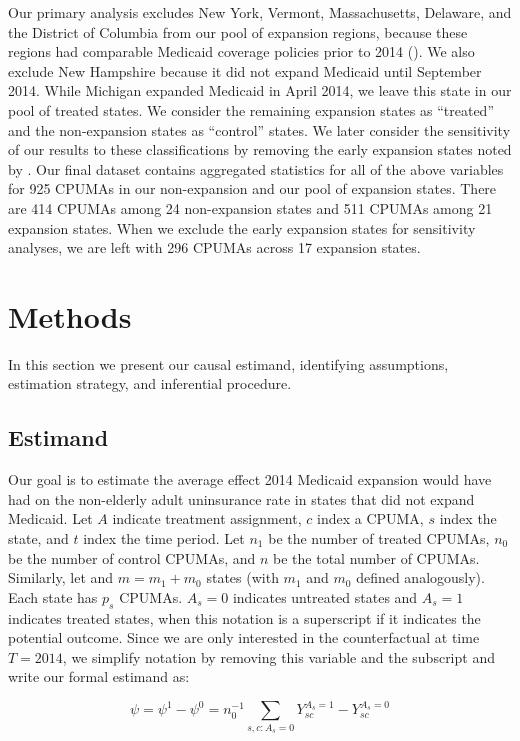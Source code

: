 \documentclass[article]{imsart}
\theoremstyle{plain}
\theoremstyle{remark}
\begin{document}
Our primary analysis excludes New York, Vermont, Massachusetts, Delaware, and the District of Columbia from our pool of expansion regions, because these regions had comparable Medicaid coverage policies prior to 2014 (\cite{kaestner2017effects}). We also exclude New Hampshire because it did not expand Medicaid until September 2014. While Michigan expanded Medicaid in April 2014, we leave this state in our pool of treated states. We consider the remaining expansion states as ``treated'' and the non-expansion states as ``control'' states. We later consider the sensitivity of our results to these classifications by removing the early expansion states noted by \cite{frean2017premium}. Our final dataset contains aggregated statistics for all of the above variables for 925 CPUMAs in our non-expansion and our pool of expansion states. There are 414 CPUMAs among 24 non-expansion states and 511 CPUMAs among 21 expansion states. When we exclude the early expansion states for sensitivity analyses, we are left with 296 CPUMAs across 17 expansion states.

\section{Methods}\label{sec:methods}

In this section we present our causal estimand, identifying assumptions, estimation strategy, and inferential procedure.

\subsection{Estimand}

Our goal is to estimate the average effect 2014 Medicaid expansion would have had on the non-elderly adult uninsurance rate in states that did not expand Medicaid. Let $A$ indicate treatment assignment, $c$ index a CPUMA, $s$ index the state, and $t$ index the time period. Let $n_1$ be the number of treated CPUMAs, $n_0$ be the number of control CPUMAs, and $n$ be the total number of CPUMAs. Similarly, let and $m = m_1 + m_0$ states (with $m_1$ and $m_0$ defined analogously). Each state has $p_s$ CPUMAs. $A_s=0$ indicates untreated states and $A_s=1$ indicates treated states, when this notation is a superscript if it indicates the potential outcome. Since we are only interested in the counterfactual at time $T = 2014$, we simplify notation by removing this variable and the subscript and write our formal estimand as:

\begin{equation}
\psi = \psi^1 - \psi^0 = n_0^{-1}\sum_{s, c: A_s = 0} Y_{sc}^{A_s = 1} - Y_{sc}^{A_s = 0} 
\end{equation}
\end{document}
